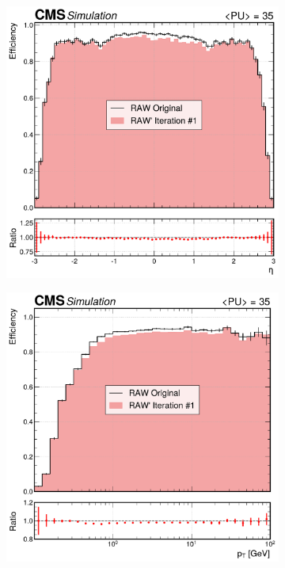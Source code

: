 \begin{figure}[!htbp]
        \centering
        \begin{subfigure}[b]{0.49\textwidth}
            \centering
            \includegraphics[width=\textwidth]{Figures/Chapter5/efficiency_comparison_1_eta.pdf}
            \caption{}
        \end{subfigure}
        \begin{subfigure}[b]{0.49\textwidth}
            \centering
            \includegraphics[width=\textwidth]{Figures/Chapter5/efficiency_comparison_1_pt.pdf}

\end{subfigure}
\end{figure}

